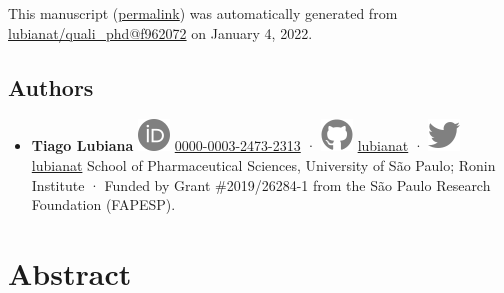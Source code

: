 This manuscript
(\href{https://lubianat.github.io/quali_phd/v/f962072fcd0685f369693089c4c2d0b96e523fd1/}{permalink})
was automatically generated
from \href{https://github.com/lubianat/quali_phd/tree/f962072fcd0685f369693089c4c2d0b96e523fd1}{lubianat/quali\_phd@f962072}
on January 4, 2022.

\hypertarget{authors}{%
\subsection{Authors}\label{authors}}

\begin{itemize}
\tightlist
\item
  \textbf{Tiago Lubiana}
  \includegraphics{images/orcid.svg}
  \href{https://orcid.org/0000-0003-2473-2313}{0000-0003-2473-2313}
  · \includegraphics{images/github.svg}
  \href{https://github.com/lubianat}{lubianat}
  · \includegraphics{images/twitter.svg}
  \href{https://twitter.com/lubianat}{lubianat}
  School of Pharmaceutical Sciences, University of São Paulo; Ronin Institute
  · Funded by Grant \#2019/26284-1 from the São Paulo Research Foundation (FAPESP).
\end{itemize}

\hypertarget{abstract}{%
\section{Abstract}\label{abstract}}

